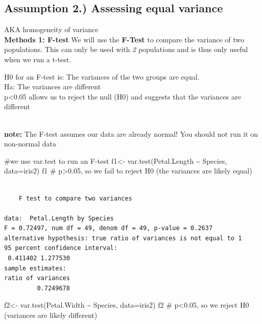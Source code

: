 \documentclass[
  letterpaper,
  DIV=11,
  numbers=noendperiod]{scrartcl}
\newenvironment{Shaded}{\begin{snugshade}}{\end{snugshade}}
\newcommand{\AttributeTok}[1]{\textcolor[rgb]{0.40,0.45,0.13}{#1}}
\newcommand{\CommentTok}[1]{\textcolor[rgb]{0.37,0.37,0.37}{#1}}
\newcommand{\FunctionTok}[1]{\textcolor[rgb]{0.28,0.35,0.67}{#1}}
\newcommand{\NormalTok}[1]{\textcolor[rgb]{0.00,0.23,0.31}{#1}}
\newcommand{\OtherTok}[1]{\textcolor[rgb]{0.00,0.23,0.31}{#1}}
\newcommand{\SpecialCharTok}[1]{\textcolor[rgb]{0.37,0.37,0.37}{#1}}
\begin{document}
\subsection{\texorpdfstring{\textbf{Assumption 2.) Assessing equal
variance}}{Assumption 2.) Assessing equal variance}}

AKA homogeneity of variance\\

\textbf{Methods 1: F-test} We will use the \textbf{F-Test} to compare
the variance of two populations. This can only be used with \emph{2}
populations and is thus only useful when we run a t-test.

H0 for an F-test is: The variances of the two groups are equal.\\
Ha: The variances are different\\
p\textless0.05 allows us to reject the null (H0) and suggests that the
variances are different\\
\strut \\
\textbf{note:} The F-test assumes our data are already normal! You
should not run it on non-normal data

\begin{Shaded}
\begin{Highlighting}[]
\CommentTok{\#we use var.test to run an F{-}test}
\NormalTok{f1}\OtherTok{\textless{}{-}} \FunctionTok{var.test}\NormalTok{(Petal.Length }\SpecialCharTok{\textasciitilde{}}\NormalTok{ Species, }\AttributeTok{data=}\NormalTok{iris2)}
\NormalTok{f1 }\CommentTok{\# p\textgreater{}0.05, so we fail to reject H0 (the variances are likely equal)}
\end{Highlighting}
\end{Shaded}

\begin{verbatim}

    F test to compare two variances

data:  Petal.Length by Species
F = 0.72497, num df = 49, denom df = 49, p-value = 0.2637
alternative hypothesis: true ratio of variances is not equal to 1
95 percent confidence interval:
 0.411402 1.277530
sample estimates:
ratio of variances 
         0.7249678 
\end{verbatim}

\begin{Shaded}
\begin{Highlighting}[]
\NormalTok{f2}\OtherTok{\textless{}{-}} \FunctionTok{var.test}\NormalTok{(Petal.Width }\SpecialCharTok{\textasciitilde{}}\NormalTok{ Species, }\AttributeTok{data=}\NormalTok{iris2)}
\NormalTok{f2 }\CommentTok{\# p\textless{}0.05, so we reject H0 (variances are likely different)}
\end{Highlighting}
\end{Shaded}
\end{document}
